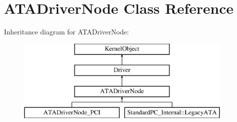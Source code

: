 \hypertarget{class_a_t_a_driver_node}{}\section{A\+T\+A\+Driver\+Node Class Reference}
\label{class_a_t_a_driver_node}
Inheritance diagram for A\+T\+A\+Driver\+Node\+:\begin{figure}[H]
\begin{center}
\leavevmode
\includegraphics[height=4.000000cm]{class_a_t_a_driver_node}
\end{center}
\end{figure}

